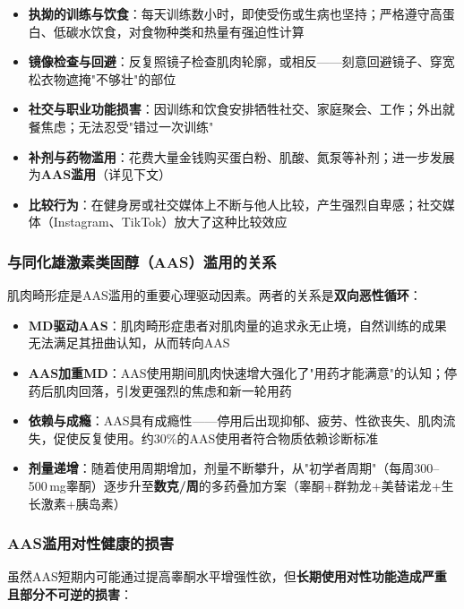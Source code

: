 \documentclass[12pt,a4paper,twoside]{ctexbook}
\begin{document}
\begin{itemize}[leftmargin=2cm]
	\item \textbf{执拗的训练与饮食}：每天训练数小时，即使受伤或生病也坚持；严格遵守高蛋白、低碳水饮食，对食物种类和热量有强迫性计算
	\item \textbf{镜像检查与回避}：反复照镜子检查肌肉轮廓，或相反——刻意回避镜子、穿宽松衣物遮掩"不够壮"的部位
	\item \textbf{社交与职业功能损害}：因训练和饮食安排牺牲社交、家庭聚会、工作；外出就餐焦虑；无法忍受"错过一次训练"
	\item \textbf{补剂与药物滥用}：花费大量金钱购买蛋白粉、肌酸、氮泵等补剂；进一步发展为\textbf{AAS滥用}（详见下文）
	\item \textbf{比较行为}：在健身房或社交媒体上不断与他人比较，产生强烈自卑感；社交媒体（Instagram、TikTok）放大了这种比较效应
\end{itemize}

\subsubsection{与同化雄激素类固醇（AAS）滥用的关系}

肌肉畸形症是AAS滥用的重要心理驱动因素。两者的关系是\textbf{双向恶性循环}：

\begin{itemize}[leftmargin=2cm]
	\item \textbf{MD驱动AAS}：肌肉畸形症患者对肌肉量的追求永无止境，自然训练的成果无法满足其扭曲认知，从而转向AAS
	\item \textbf{AAS加重MD}：AAS使用期间肌肉快速增大强化了"用药才能满意"的认知；停药后肌肉回落，引发更强烈的焦虑和新一轮用药
	\item \textbf{依赖与成瘾}：AAS具有成瘾性——停用后出现抑郁、疲劳、性欲丧失、肌肉流失，促使反复使用。约30\%的AAS使用者符合物质依赖诊断标准
	\item \textbf{剂量递增}：随着使用周期增加，剂量不断攀升，从"初学者周期"（每周300--500\,mg睾酮）逐步升至\textbf{数克/周}的多药叠加方案（睾酮+群勃龙+美替诺龙+生长激素+胰岛素）
\end{itemize}

\subsubsection{AAS滥用对性健康的损害}

虽然AAS短期内可能通过提高睾酮水平增强性欲，但\textbf{长期使用对性功能造成严重且部分不可逆的损害}：
\end{document}
